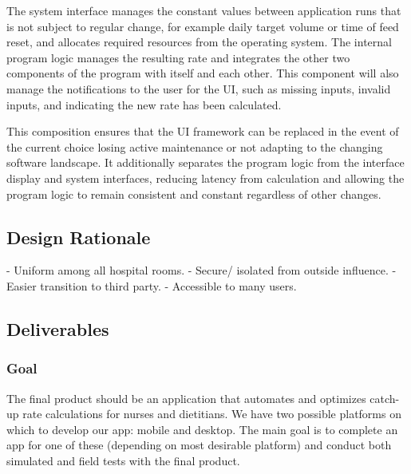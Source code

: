 \documentclass[onecolumn, draftclsnofoot,10pt, compsoc]{IEEEtran}
\begin{document}
The system interface manages the constant values between application runs that is not subject to regular change, for example daily target volume or time of feed reset, and allocates required resources from the operating system.
The internal program logic manages the resulting rate and integrates the other two components of the program with itself and each other.
This component will also manage the notifications to the user for the UI, such as missing inputs, invalid inputs, and indicating the new rate has been calculated.

This composition ensures that the UI framework can be replaced in the event of the current choice losing active maintenance or not adapting to the changing software landscape.
It additionally separates the program logic from the interface display and system interfaces, reducing latency from calculation and allowing the program logic to remain consistent and constant regardless of other changes.

\subsection{Design Rationale}
- Uniform among all hospital rooms.
\newline
- Secure/ isolated from outside influence.
\newline
- Easier transition to third party.
\newline
- Accessible to many users.

\subsection{Deliverables}
\subsubsection{Goal}
The final product should be an application that automates and optimizes catch-up rate calculations for nurses and dietitians. We have two possible platforms on which to develop our app: mobile and desktop. The main goal is to complete an app for one of these (depending on most desirable platform) and conduct both simulated and field tests with the final product.
\end{document}
